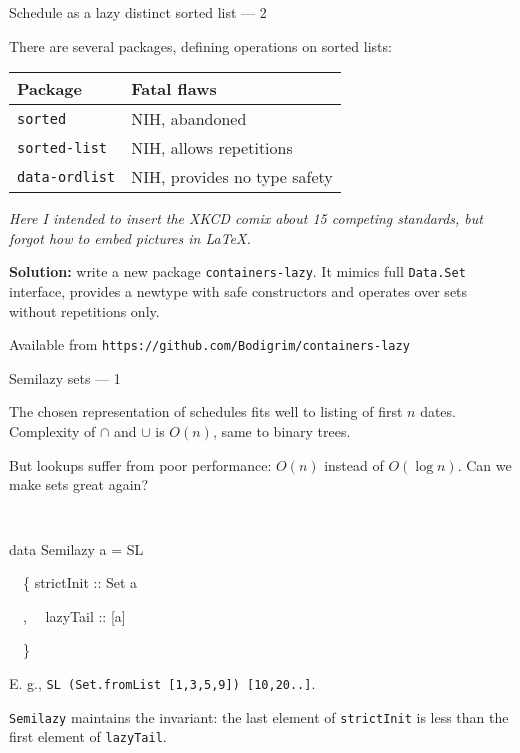 \documentclass[handout]{beamer}
\begin{document}
\begin{frame}{Schedule as a lazy distinct sorted list --- 2}

There are several
packages, defining operations on sorted lists:

\begin{table}[h]
\begin{tabular}{ll}
Package & Fatal flaws \\
\hline
{\tt sorted} & NIH, abandoned \\
{\tt sorted-list} & NIH, allows repetitions \\
{\tt data-ordlist} & NIH, provides no type safety \\
\end{tabular}
\end{table}

\pause
{\em Here I intended to insert the XKCD comix about 15 competing standards,
but forgot how to embed pictures in \LaTeX.}

\bigskip

\pause
{\bf Solution:} write a new package {\tt containers-lazy}.
It mimics full {\tt Data.Set} interface,
provides a newtype with safe constructors and
operates over sets without repetitions only.

\bigskip

\pause
Available from {\tt https://github.com/Bodigrim/containers-lazy}

\end{frame}

\begin{frame}{Semilazy sets --- 1}

The chosen representation of schedules fits well to listing of first $n$ dates.
Complexity of $\cap$ and $\cup$ is $O(n)$,
same to binary trees.

\medskip

\pause
But lookups suffer
from poor performance: $O(n)$ instead of $O(\log n)$.
Can we make sets great again?

\pause

\medskip

{\tt
\par data Semilazy a = SL
\par ~~\{ strictInit :: Set a
\par ~~, ~~lazyTail :: [a]
\par ~~\}
}

\medskip

E. g., {\tt SL (Set.fromList [1,3,5,9]) [10,20..]}.

\medskip

\pause
{\tt Semilazy} maintains the invariant:
the last element of {\tt strictInit} is less than the first
element of {\tt lazyTail}.
\end{frame}
\end{document}
